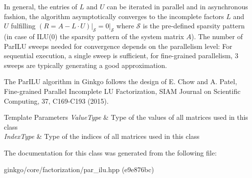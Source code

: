 In general, the entries of $L$ and $U$ can be iterated in parallel and in asynchronous fashion, the algorithm asymptotically converges to the incomplete factors $L$ and $U$ fulfilling $\left(R = A - L \cdot U\right)\vert_\mathcal{S} = 0\vert_\mathcal{S}$ where $\mathcal{S}$ is the pre-\/defined sparsity pattern (in case of I\+L\+U(0) the sparsity pattern of the system matrix $A$). The number of Par\+I\+LU sweeps needed for convergence depends on the parallelism level\+: For sequential execution, a single sweep is sufficient, for fine-\/grained parallelism, 3 sweeps are typically generating a good approximation.

The Par\+I\+LU algorithm in Ginkgo follows the design of E. Chow and A. Patel, Fine-\/grained Parallel Incomplete LU Factorization, S\+I\+AM Journal on Scientific Computing, 37, C169-\/\+C193 (2015).


\begin{DoxyTemplParams}{Template Parameters}
{\em Value\+Type} & Type of the values of all matrices used in this class \\
\hline
{\em Index\+Type} & Type of the indices of all matrices used in this class \\
\hline
\end{DoxyTemplParams}


The documentation for this class was generated from the following file\+:\begin{DoxyCompactItemize}
\item 
ginkgo/core/factorization/par\+\_\+ilu.\+hpp (e9e876bc)\end{DoxyCompactItemize}
